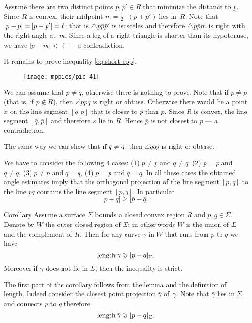 Assume there are two distinct points $\bar p, \bar p'\in R$ that minimize the distance to $p$.
Since $R$ is convex, their midpoint $m=\tfrac12\cdot (\bar p+\bar p')$ lies in~$R$.
Note that $|p-\bar p|\z=|p-\bar p'|=\ell$; that is $\triangle p\bar p\bar p'$ is isosceles and therefore $\triangle p\bar p m$ is right with the right angle at~$m$.
Since a leg of a right triangle is shorter than its hypotenuse, we have $|p-m|<\ell$ --- a contradiction. 

It remains to prove inequality \ref{eq:short-cpp}.

\begin{wrapfigure}{o}{37 mm}
\vskip-0mm
\centering
\texttt{[image: mppics/pic-41]}
\vskip-0mm
\end{wrapfigure}

We can assume that $\bar p\ne\bar q$, otherwise there is nothing to prove.
Note that if $p\ne \bar p$ (that is, if $p\notin R$), 
then $\angle p \bar p \bar q$ is right or obtuse.
Otherwise there would be a point $x$ on the line segment $[\bar q,\bar p]$ that is closer to $p$ than $\bar p$.
Since $R$ is convex, the line segment $[\bar q,\bar p]$ and therefore $x$ lie in $R$.
Hence $\bar p$ is not closest to $p$ --- a contradiction.

The same way we can show that  if $q\z\ne \bar q$, then $\angle q \bar q \bar p$ is right or obtuse.

We have to consider the following 4 cases:
(1) $p\ne \bar p$ and $q\ne \bar q$,
(2) $p= \bar p$ and $q\ne \bar q$,
(3) $p\ne \bar p$ and $q= \bar q$,
(4) $p= \bar p$ and $q= \bar q$.
In all these cases the obtained angle estimates imply that the orthogonal projection of the line segment $[p,q]$ to the line $\bar p\bar q$ contains the line segment $[\bar p,\bar q]$.
In particular 
\[|p-q|\ge |\bar p-\bar q|.\]
\qedsf

\begin{thm}{Corollary}
Assume a surface $\Sigma$ bounds a closed convex region $R$ and  $p,q \in \Sigma$.
Denote by $W$ the outer closed region of $\Sigma$; in other words $W$ is the union of $\Sigma$ and the complement of $R$.
Then for any curve $\gamma$ in $W$ that runs from $p$ to $q$ we have
\[\mathop{\rm length}\nolimits\gamma\geqslant |p-q|_\Sigma.\]
Moreover if  $\gamma$ does not lie in $\Sigma$, then the inequality is strict.
\end{thm}

The first part of the corollary follows from the lemma and the definition of length.
Indeed consider the closest point projection $\bar\gamma$ of~$\gamma$.
Note that $\bar\gamma$ lies in $\Sigma$ and connects $p$ to $q$ therefore 
\[\mathop{\rm length}\nolimits\bar\gamma\geqslant |p-q|_\Sigma.\]

